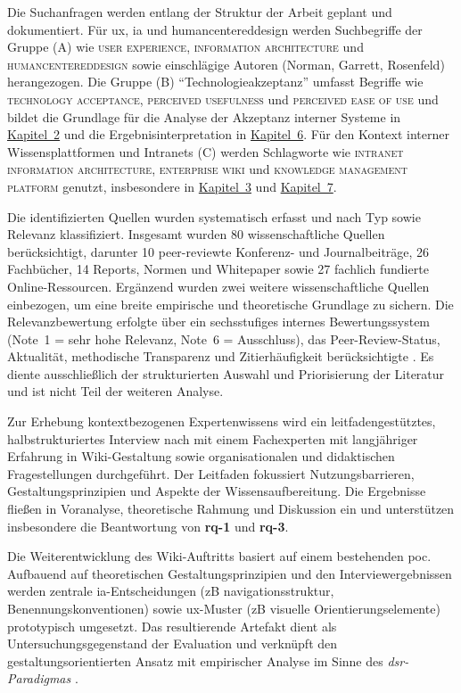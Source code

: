 Die Suchanfragen werden entlang der Struktur der Arbeit geplant und dokumentiert. Für \Gls{ux}, \Gls{ia} und \Gls{humancentereddesign} werden Suchbegriffe der Gruppe (A) wie \textsc{user experience}, \textsc{information architecture} und \textsc{\Gls{humancentereddesign}} sowie einschlägige Autoren (Norman, Garrett, Rosenfeld) herangezogen. Die Gruppe (B) \enquote{Technologieakzeptanz} umfasst Begriffe wie \textsc{technology acceptance}, \textsc{perceived usefulness} und \textsc{perceived ease of use} und bildet die Grundlage für die Analyse der Akzeptanz interner Systeme in \hyperref[ch:02_theoretical-foundations]{Kapitel~2} und die Ergebnisinterpretation in \hyperref[ch:06_discussion]{Kapitel~6}. Für den Kontext interner Wissensplattformen und Intranets (C) werden Schlagworte wie \textsc{intranet information architecture}, \textsc{enterprise wiki} und \textsc{knowledge management platform} genutzt, insbesondere in \hyperref[ch:03_pre-analysis]{Kapitel~3} und \hyperref[ch:07_recommendations]{Kapitel~7}.

Die identifizierten Quellen wurden systematisch erfasst und nach Typ sowie Relevanz klassifiziert. Insgesamt wurden 80 wissenschaftliche Quellen berücksichtigt, darunter 10 peer-reviewte Konferenz- und Journalbeiträge, 26 Fachbücher, 14 Reports, Normen und Whitepaper sowie 27 fachlich fundierte Online-Ressourcen. Ergänzend wurden zwei weitere wissenschaftliche Quellen einbezogen, um eine breite empirische und theoretische Grundlage zu sichern.
Die Relevanzbewertung erfolgte über ein sechsstufiges internes Bewertungssystem (Note~1 = sehr hohe Relevanz, Note~6 = Ausschluss), das Peer-Review-Status, Aktualität, methodische Transparenz und Zitierhäufigkeit berücksichtigte \cite{200:ScribbrInductiveDeductive2023}. Es diente ausschließlich der strukturierten Auswahl und Priorisierung der Literatur und ist nicht Teil der weiteren Analyse.

Zur Erhebung kontextbezogenen Expertenwissens wird ein leitfadengestütztes, halbstrukturiertes Interview nach \citeauthor{405:KvaleBrinkmann2015} mit einem Fachexperten mit langjähriger Erfahrung in Wiki-Gestaltung sowie organisationalen und didaktischen Fragestellungen durchgeführt. Der Leitfaden fokussiert Nutzungsbarrieren, Gestaltungsprinzipien und Aspekte der Wissensaufbereitung. Die Ergebnisse fließen in Voranalyse, theoretische Rahmung und Diskussion ein und unterstützen insbesondere die Beantwortung von \textbf{\Gls{rq}-1} und \textbf{\Gls{rq}-3}.

Die Weiterentwicklung des Wiki-Auftritts basiert auf einem bestehenden \Gls{poc}. Aufbauend auf theoretischen Gestaltungsprinzipien und den Interviewergebnissen werden zentrale \Gls{ia}-Entscheidungen (\acrshort{zB} \Gls{navigationsstruktur}, Benennungskonventionen) sowie \Gls{ux}-Muster (\acrshort{zB} visuelle Orientierungselemente) prototypisch umgesetzt. Das resultierende Artefakt dient als Untersuchungsgegenstand der Evaluation und verknüpft den gestaltungsorientierten Ansatz mit empirischer Analyse im Sinne des \textit{\Gls{dsr}-Paradigmas} \cite{304:FraunhoferDSR2015}.

